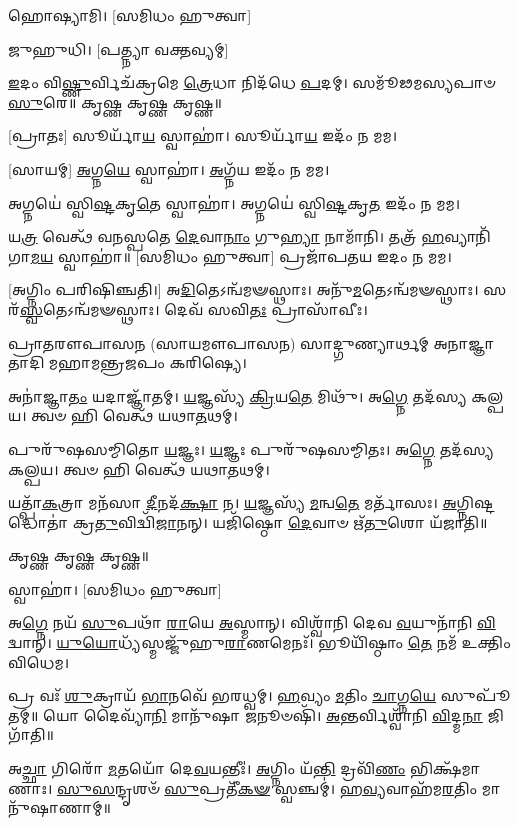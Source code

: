 𑌹𑍋𑌷𑍍𑌯𑌾𑌮𑌿। [𑌸𑌮𑌿𑌧𑌂 𑌹𑍁𑌤𑍍𑌵𑌾]

𑌜𑍁𑌹𑍁𑌧𑌿। [𑌪𑌤𑍍𑌨𑍍𑌯𑌾 𑌵𑌕𑍍𑌤𑌵𑍍𑌯𑌮𑍍]

\-\ul{𑌇}\-𑌦𑌂 𑌵𑌿\-\ul{𑌷𑍍𑌣𑍁}\-𑌰𑍍𑌵𑌿𑌚᳴𑌕𑍍𑌰𑌮𑍇 \ul{𑌤𑍍𑌰𑍇}\-𑌧𑌾 𑌨𑌿𑌦᳴𑌧𑍇 \ul{𑌪}\-𑌦𑌮𑍍। 𑌸𑌮𑍂᳴𑌢𑌮𑌸𑍍𑌯𑌪𑌾𑍞 \ul{𑌸𑍁}\-𑌰𑍇॥ 𑌕𑍃𑌷𑍍𑌣 𑌕𑍃𑌷𑍍𑌣 𑌕𑍃𑌷𑍍𑌣॥

[𑌪𑍍𑌰𑌾𑌤𑌃] 𑌸𑍂𑌰𑍍𑌯𑌾᳴\-\ul{𑌯} 𑌸𑍍𑌵𑌾𑌹𑌾॑। 𑌸𑍂𑌰𑍍𑌯𑌾᳴\-\ul{𑌯} 𑌇𑌦𑌂᳴ 𑌨 𑌮𑌮।

[𑌸𑌾𑌯𑌮𑍍] \ul{𑌅}\-𑌗𑍍𑌨\-\ul{𑌯𑍇} 𑌸𑍍𑌵𑌾𑌹𑌾॑। \ul{𑌅}\-𑌗𑍍𑌨᳴𑌯 𑌇𑌦𑌂᳴ 𑌨 𑌮𑌮।

𑌅𑌗𑍍𑌨𑌯𑍇॑ 𑌸𑍍𑌵𑌿\-\ul{𑌷𑍍𑌟}\-𑌕𑍃\-\ul{𑌤𑍇} 𑌸𑍍𑌵𑌾𑌹𑌾॑। 𑌅𑌗𑍍𑌨𑌯𑍇॑ 𑌸𑍍𑌵𑌿\-\ul{𑌷𑍍𑌟}\-𑌕𑍃\-\ul{𑌤} 𑌇𑌦𑌂᳴ 𑌨 𑌮𑌮।


𑌯\-\ul{𑌤𑍍𑌰} 𑌵𑍇𑌤𑍍𑌥᳴ 𑌵𑌨𑌸𑍍𑌪𑌤𑍇 \ul{𑌦𑍇}\-𑌵𑌾\-\ul{𑌨𑌾𑌂} 𑌗𑍁\-\ul{𑌹𑍍𑌯𑌾} 𑌨𑌾𑌮𑌾᳴𑌨𑌿। 𑌤𑌤𑍍𑌰᳴ \ul{𑌹}\-𑌵𑍍𑌯𑌾𑌨𑌿᳴ 𑌗𑌾\-\ul{𑌮}\-\-\ul{𑌯} 𑌸𑍍𑌵𑌾𑌹𑌾॑॥ [𑌸𑌮𑌿𑌧𑌂 𑌹𑍁𑌤𑍍𑌵𑌾]
𑌪𑍍𑌰𑌜𑌾᳴𑌪𑌤𑌯 𑌇𑌦𑌂 𑌨 𑌮𑌮। 

[𑌅𑌗𑍍𑌨𑌿𑌂 𑌪𑌰𑌿𑌷𑌿𑌞𑍍𑌚𑌤𑌿।]
𑌅\-\ul{𑌦𑌿}\-𑌤𑍇𑌽𑌨𑍍𑌵᳴𑌮𑍟𑌸𑍍𑌥𑌾𑌃। 𑌅𑌨𑍁᳴\-\ul{𑌮}\-𑌤𑍇𑌽𑌨𑍍𑌵᳴𑌮𑍟𑌸𑍍𑌥𑌾𑌃। 𑌸𑌰᳴\-\ul{𑌸𑍍𑌵}\-𑌤𑍇𑌽𑌨𑍍𑌵᳴𑌮𑍟𑌸𑍍𑌥𑌾𑌃। 𑌦𑍇𑌵᳴ 𑌸𑌵𑌿\-\ul{𑌤𑌃} 𑌪𑍍𑌰𑌾𑌸𑌾᳴𑌵𑍀𑌃।


𑌪𑍍𑌰𑌾𑌤𑌰𑍗𑌪𑌾𑌸𑌨 (𑌸𑌾𑌯𑌮𑍗𑌪𑌾𑌸𑌨) 𑌸𑌾𑌦𑍍𑌗𑍁𑌣𑍍𑌯𑌾𑌰𑍍𑌥𑌮𑍍 𑌅𑌨𑌾𑌜𑍍𑌞𑌾𑌤𑌾𑌦𑌿 𑌮𑌹𑌾𑌮𑌨𑍍𑌤𑍍𑌰𑌜𑌪𑌂 𑌕𑌰𑌿𑌷𑍍𑌯𑍇।

𑌅𑌨𑌾॑𑌜𑍍𑌞𑌾\-\ul{𑌤𑌂} 𑌯𑌦𑌾𑌜𑍍𑌞𑌾᳴𑌤𑌮𑍍। \ul{𑌯}\-𑌜𑍍𑌞𑌸𑍍𑌯᳴ \ul{𑌕𑍍𑌰𑌿}\-𑌯\-\ul{𑌤𑍇} 𑌮𑌿𑌥𑍁᳴।
𑌅\-\ul{𑌗𑍍𑌨𑍇} 𑌤𑌦᳴𑌸𑍍𑌯 𑌕𑌲𑍍𑌪𑌯। 𑌤𑍍𑌵𑍞 𑌹𑌿 𑌵𑍇𑌤𑍍𑌥᳴ 𑌯𑌥𑌾\-\ul{𑌤}\-𑌥𑌮𑍍।

𑌪𑍁𑌰𑍁᳴𑌷𑌸𑌮𑍍𑌮𑌿𑌤𑍋 \ul{𑌯}\-𑌜𑍍𑌞𑌃। \ul{𑌯}\-𑌜𑍍𑌞𑌃 𑌪𑍁𑌰𑍁᳴𑌷𑌸𑌮𑍍𑌮𑌿𑌤𑌃।
𑌅\-\ul{𑌗𑍍𑌨𑍇} 𑌤𑌦᳴𑌸𑍍𑌯 𑌕𑌲𑍍𑌪𑌯। 𑌤𑍍𑌵𑍞 𑌹𑌿 𑌵𑍇𑌤𑍍𑌥᳴ 𑌯𑌥𑌾\-\ul{𑌤}\-𑌥𑌮𑍍।

𑌯𑌤𑍍𑌪𑌾᳴\-\ul{𑌕}\-𑌤𑍍𑌰𑌾 𑌮𑌨᳴𑌸𑌾 \ul{𑌦𑍀}\-𑌨𑌦᳴\-\ul{𑌕𑍍𑌷𑌾} 𑌨। \ul{𑌯}\-𑌜𑍍𑌞𑌸𑍍𑌯᳴ \ul{𑌮}\-𑌨𑍍𑌵\-\ul{𑌤𑍇} 𑌮𑌰𑍍𑌤𑌾᳴𑌸𑌃।
\-\ul{𑌅}\-𑌗𑍍𑌨𑌿𑌷𑍍𑌟𑌦𑍍𑌧𑍋𑌤𑌾॑ 𑌕𑍍𑌰\-\ul{𑌤𑍁}\-𑌵𑌿𑌦𑍍𑌵𑌿᳴\-\ul{𑌜𑌾}\-𑌨𑌨𑍍। 𑌯𑌜𑌿᳴𑌷𑍍𑌠𑍋 \ul{𑌦𑍇}\-𑌵𑌾𑍞 𑌋᳴\-\ul{𑌤𑍁}\-𑌶𑍋 𑌯᳴𑌜𑌾𑌤𑌿॥

𑌕𑍃𑌷𑍍𑌣 𑌕𑍃𑌷𑍍𑌣 𑌕𑍃𑌷𑍍𑌣॥

𑌸𑍍𑌵𑌾𑌹𑌾॑। [𑌸𑌮𑌿𑌧𑌂 𑌹𑍁𑌤𑍍𑌵𑌾]


𑌅\-\ul{𑌗𑍍𑌨𑍇} 𑌨𑌯᳴ \ul{𑌸𑍁}\-𑌪𑌥𑌾᳴ \ul{𑌰𑌾}\-𑌯𑍇 \ul{𑌅}\-𑌸𑍍𑌮𑌾𑌨𑍍। 𑌵𑌿𑌶𑍍𑌵𑌾᳴𑌨𑌿 𑌦𑍇𑌵 \ul{𑌵}\-𑌯𑍁𑌨𑌾᳴𑌨𑌿 \ul{𑌵𑌿}\-𑌦𑍍𑌵𑌾𑌨𑍍। \ul{𑌯𑍁}\-\-\ul{𑌯𑍋}\-𑌧𑍍𑌯᳴𑌸𑍍𑌮𑌜𑍍𑌜𑍁᳴𑌹𑍁\-\ul{𑌰𑌾}\-𑌣𑌮𑍇𑌨𑌃᳴। 𑌭𑍂𑌯𑌿᳴𑌷𑍍𑌠𑌾𑌂 \ul{𑌤𑍇} 𑌨𑌮᳴ 𑌉𑌕𑍍𑌤𑌿𑌂 𑌵𑌿𑌧𑍇𑌮। 

𑌪𑍍𑌰 𑌵𑌃᳴ \ul{𑌶𑍁}\-𑌕𑍍𑌰𑌾𑌯᳴ \ul{𑌭𑌾}\-𑌨𑌵𑍇᳴ 𑌭𑌰𑌧𑍍𑌵𑌮𑍍। \ul{𑌹}\-𑌵𑍍𑌯𑌂 \ul{𑌮}\-𑌤𑌿𑌂 \ul{𑌚𑌾}\-𑌗𑍍𑌨\-\ul{𑌯𑍇} 𑌸𑍁𑌪𑍂᳴𑌤𑌮𑍍॥ 𑌯𑍋 𑌦𑍈𑌵𑍍𑌯𑌾᳴\-\ul{𑌨𑌿} 𑌮𑌾𑌨𑍁᳴𑌷𑌾 \ul{𑌜}\-𑌨𑍂𑍞𑌷𑌿᳴। \ul{𑌅}\-𑌨𑍍𑌤𑌰𑍍𑌵𑌿𑌶𑍍𑌵𑌾᳴𑌨𑌿 \ul{𑌵𑌿}\-𑌦𑍍𑌮\-\ul{𑌨𑌾} 𑌜𑌿𑌗𑌾᳴𑌤𑌿॥

𑌅\-\ul{𑌚𑍍𑌛𑌾} 𑌗𑌿𑌰𑍋᳴ \ul{𑌮}\-𑌤𑌯𑍋᳴ 𑌦𑍇\-\ul{𑌵}\-𑌯𑌨𑍍𑌤𑍀𑌃॑। \ul{𑌅}\-𑌗𑍍𑌨𑌿𑌂 𑌯᳴\-\ul{𑌨𑍍𑌤𑌿} 𑌦𑍍𑌰𑌵𑌿᳴\-\ul{𑌣𑌂} 𑌭𑌿𑌕𑍍𑌷᳴𑌮𑌾𑌣𑌾𑌃।
\-\ul{𑌸𑍁}\-\-\ul{𑌸}\-𑌨𑍍𑌦𑍃𑌶𑍞᳴ \ul{𑌸𑍁}\-𑌪𑍍𑌰𑌤𑍀᳴\-\ul{𑌕}\-\-\ul{𑍟} 𑌸𑍍𑌵𑌞𑍍𑌚𑌮𑍍॑। \ul{𑌹}\-\-\ul{𑌵𑍍𑌯}\-𑌵𑌾𑌹᳴𑌮\-\ul{𑌰}\-𑌤𑌿𑌂 𑌮𑌾𑌨𑍁᳴𑌷𑌾𑌣𑌾𑌮𑍍॥

